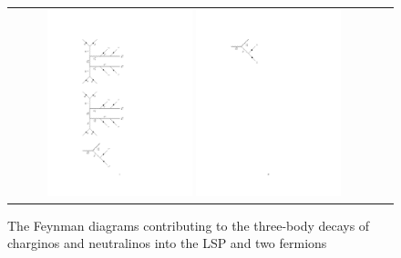\begin{figure}
	\centering
	\begin{tabular}{cc}
		\includegraphics[width=0.40\textwidth]{theory/pics/chi02_tautau.pdf}
		\includegraphics[width=0.40\textwidth]{theory/pics/chi02_bbarb.pdf}
	\end{tabular}
	\caption{The Feynman diagrams contributing to the three-body decays of charginos and neutralinos into the LSP and two fermions}
	\label{fig:SUSY_3bodydecay_chi}
\end{figure}

